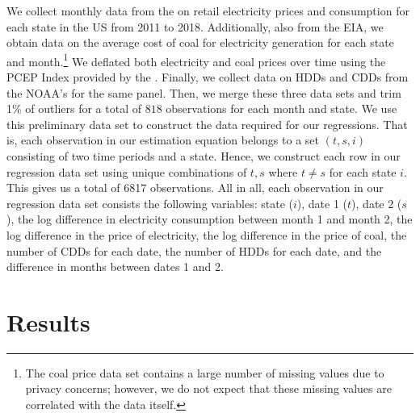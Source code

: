 \documentclass[11pt,a4paper]{extarticle}
\begin{document}
We collect monthly data from the \cite{EIANetgen} on retail electricity prices and consumption for each state in the US from 2011 to 2018. Additionally, also from the EIA, we obtain data on the average cost of coal for electricity generation for each state and month.\footnote{ The coal price data set contains a large number of missing values due to privacy concerns; however, we do not expect that these missing values are correlated with the data itself.} We deflated both electricity and coal prices over time using the PCEP Index provided by the  \cite{USBEA}. 
Finally, we collect data on HDDs and CDDs from the NOAA's \citet{CPC} for the same panel. Then, we merge these three data sets and trim 1\% of outliers for a total of $818$ observations for each month and state. We use this preliminary data set to construct the data required for our regressions. That is, each observation in our estimation equation belongs to a set $(t,s,i)$ consisting of two time periods and a state. Hence, we construct each row in our regression data set using unique combinations of $t,s$ where $t \neq s$ for each state $i$. This gives us a total of 6817 observations.  All in all, each observation in our regression data set consists the following variables: state ($i$), date 1 ($t$), date 2 ($s$), the log difference in electricity consumption between month 1 and month 2, the log difference in the price of electricity, the log difference in the price of coal, the number of CDDs for each date, the number of HDDs for each date, and the difference in months between dates 1 and 2. 




\section{Results}
\label{sec:results}
\end{document}
